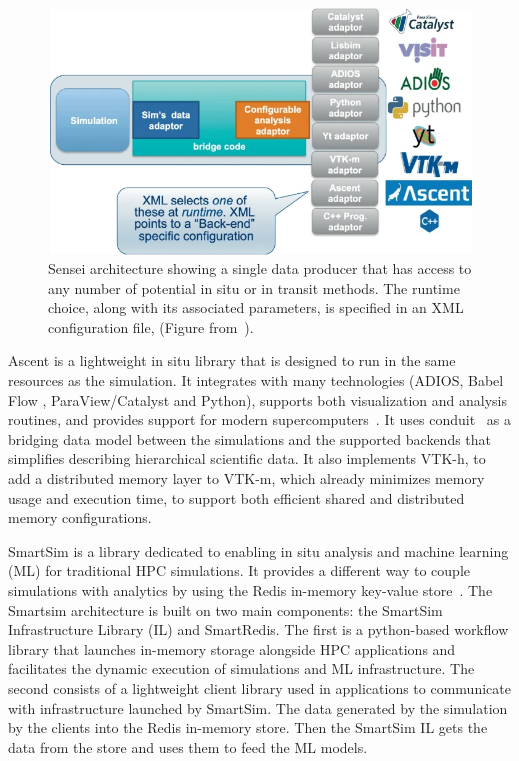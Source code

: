 \begin{figure}[h!]\centering
\includegraphics[scale=0.5]{figures/sensei.png}
\caption{Sensei architecture showing a single data producer that has access to any number of potential in situ or in transit methods. The runtime choice, along with its associated parameters, is specified in an XML configuration file, (Figure from~\cite{bethel_sensei_2022}).}
\label{figsensei}
\end{figure}

Ascent\cite{ noauthor_ascent_nodate, Larsen-alpine-isav17, triggers_ascent, Larsen_ascent} is a lightweight in situ library that is designed to run in the same resources as the simulation. It integrates with many technologies (ADIOS, Babel Flow \cite{babel}, ParaView/Catalyst and Python), supports both visualization and analysis routines, and provides support for modern supercomputers~\cite{childs2022situ}.  
It uses conduit~\cite{larsen_strawman_2015, noauthor_conduit_nodate} as a bridging data model between the simulations and the supported backends that simplifies describing hierarchical scientific data. It also implements VTK-h, to add a distributed memory layer to VTK-m, which already minimizes memory usage and execution time, to support both efficient shared and distributed memory configurations. 

SmartSim\cite{smartsim_2022, site_introduction_smartsim, partee2021using_smartsim} is a library dedicated to enabling in situ analysis and machine learning (ML) for traditional HPC simulations. It provides a different way to couple simulations with analytics by using the Redis\cite{redis} in-memory key-value store~\cite{idreos2019learning_key_value}. 
The Smartsim architecture is built on two main components: the SmartSim Infrastructure Library (IL) and SmartRedis. The first is a python-based workflow library that launches in-memory storage alongside HPC applications and facilitates the dynamic execution of simulations and ML infrastructure. 
The second consists of a lightweight client library used in applications to communicate with infrastructure launched by SmartSim. 
The data generated by the simulation by the clients into the Redis in-memory store. Then the SmartSim IL gets the data from the store and uses them to feed the ML models.

